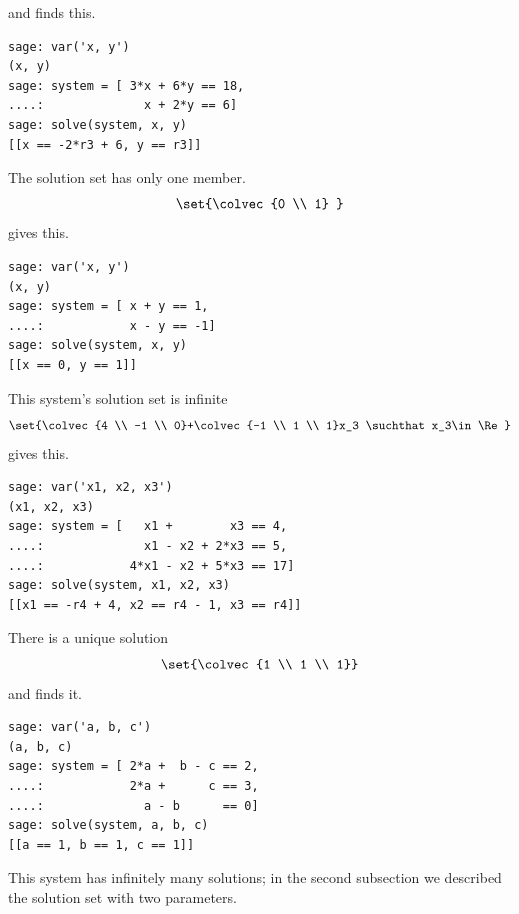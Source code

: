 \begin{exercises}
\begin{answer}
\begin{exparts}
              and \Sage{} finds this. 
\begin{lstlisting}
sage: var('x, y')
(x, y)
sage: system = [ 3*x + 6*y == 18,
....:              x + 2*y == 6]
sage: solve(system, x, y)
[[x == -2*r3 + 6, y == r3]]                
\end{lstlisting}
        \partsitem The solution set has only one member.
          \begin{equation*}
             \set{\colvec{0 \\ 1} }
          \end{equation*}
          \Sage{} gives this.
\begin{lstlisting}
sage: var('x, y')
(x, y)
sage: system = [ x + y == 1,
....:            x - y == -1]
sage: solve(system, x, y)
[[x == 0, y == 1]]            
\end{lstlisting}
        \partsitem This system's solution set is infinite
          \begin{equation*}
            \set{\colvec{4 \\ -1 \\ 0}+\colvec{-1 \\ 1 \\ 1}x_3
                             \suchthat x_3\in\Re}
          \end{equation*}
          \Sage{} gives this.
\begin{lstlisting}
sage: var('x1, x2, x3')
(x1, x2, x3)
sage: system = [   x1 +        x3 == 4,
....:              x1 - x2 + 2*x3 == 5,
....:            4*x1 - x2 + 5*x3 == 17]
sage: solve(system, x1, x2, x3)
[[x1 == -r4 + 4, x2 == r4 - 1, x3 == r4]]            
\end{lstlisting}
        \partsitem There is a unique solution
           \begin{equation*}
             \set{\colvec{1 \\ 1 \\ 1}}
           \end{equation*}
           and \Sage{} finds it.
\begin{lstlisting}
sage: var('a, b, c')
(a, b, c)
sage: system = [ 2*a +  b - c == 2,
....:            2*a +      c == 3,
....:              a - b      == 0]
sage: solve(system, a, b, c)
[[a == 1, b == 1, c == 1]]             
\end{lstlisting}
        \partsitem This system has infinitely many solutions; in the 
           second subsection we described the solution set with
           two parameters.
           \begin{equation*}

\end{equation*}
\end{exparts}
\end{answer}
\end{exercises}
